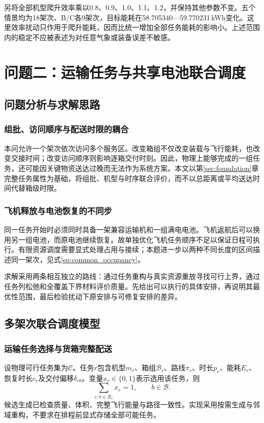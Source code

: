 \documentclass[withoutpreface,colorprint]{format}
\numberwithin{equation}{section}
\numberwithin{figure}{section}
\numberwithin{table}{section}
\begin{document}
另将全部机型爬升效率乘以0.8、0.9、1.0、1.1、1.2，并保持其他参数不变。五个情景均为18架次、B/C各9架次，目标能耗在58.705340—59.770231\,kWh变化。这里效率扰动只作用于爬升能耗，因而比统一增加全部任务能耗的影响小。上述范围内的稳定不应被表述为对任意气象或装备误差不敏感。


\section{问题二：运输任务与共享电池联合调度}
\label{sec:q2}

\subsection{问题分析与求解思路}
\subsubsection{组批、访问顺序与配送时限的耦合}
本问允许一个架次依次访问多个服务区。改变箱组不仅改变装载与飞行能耗，也改变交接时间；改变访问顺序则影响逐箱交付时刻。因此，物理上能够完成的一组任务，还可能因关键物资送达过晚而无法作为系统方案。本文以第\ref{sec:foundation}章完整任务属性为基础，将组批、机型与时序联合评价，而不以总距离或平均送达时间代替箱级时限。

\subsubsection{飞机释放与电池恢复的不同步}
同一任务开始时必须同时具备一架兼容运输机和一组满电电池。飞机返航后可以换用另一组电池，而原电池继续恢复。故单独优化飞机任务顺序不足以保证日程可执行。有限资源调度需要显式处理占用与接续\cite{pinedo2016scheduling}；本题进一步以两种不同长度的区间描述同一架次，见式\eqref{eq:common_occupancy}。

求解采用两条相互独立的路线：通过任务重构与真实资源重放寻找可行上界，通过任务列松弛和全覆盖下界材料评价质量。先给出可以执行的具体安排，再说明其最优性范围，最后检验扰动下原安排与可修复安排的差异。

\subsection{多架次联合调度模型}
\subsubsection{运输任务选择与货箱完整配送}
设物理可行任务集为$\mathcal C$。任务$r$包含机型$m_r$、箱组$\mathcal B_r$、路线$\pi_r$、时长$p_r$、能耗$E_r$、恢复时长$c_r$及交付偏移$\delta_{rb}$。变量$x_r\in\{0,1\}$表示选用该任务，则
\begin{equation}
 \sum_{r:b\in\mathcal B_r}x_r=1,\qquad b\in\mathcal B.
\label{eq:q2_cover}
\end{equation}
候选生成已检查质量、体积、完整飞行能量与路径一致性。实现采用按需生成与邻域重构，不要求在排程前显式存储全部可能任务。
\end{document}
